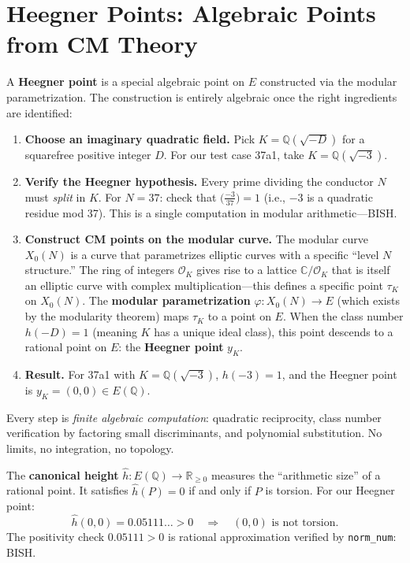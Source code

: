 \documentclass[11pt,twoside,openany]{report}
\theoremstyle{remark}
\newcommand{\BISH}{\textsf{BISH}}
\begin{document}
\section{Heegner Points: Algebraic Points from CM Theory}

A \textbf{Heegner point} is a special algebraic point on $E$ constructed via the modular parametrization. The construction is entirely algebraic once the right ingredients are identified:

\begin{enumerate}
  \item \textbf{Choose an imaginary quadratic field.} Pick $K = \mathbb{Q}(\sqrt{-D})$ for a squarefree positive integer $D$. For our test case 37a1, take $K = \mathbb{Q}(\sqrt{-3})$.

  \item \textbf{Verify the Heegner hypothesis.} Every prime dividing the conductor $N$ must \emph{split} in $K$. For $N = 37$: check that $\bigl(\frac{-3}{37}\bigr) = 1$ (i.e., $-3$ is a quadratic residue mod 37). This is a single computation in modular arithmetic---\BISH.

  \item \textbf{Construct CM points on the modular curve.} The modular curve $X_0(N)$ is a curve that parametrizes elliptic curves with a specific ``level $N$ structure.'' The ring of integers $\mathcal{O}_K$ gives rise to a lattice $\mathbb{C}/\mathcal{O}_K$ that is itself an elliptic curve with complex multiplication---this defines a specific point $\tau_K$ on $X_0(N)$. The \textbf{modular parametrization} $\varphi\colon X_0(N) \to E$ (which exists by the modularity theorem) maps $\tau_K$ to a point on $E$. When the class number $h(-D) = 1$ (meaning $K$ has a unique ideal class), this point descends to a rational point on $E$: the \textbf{Heegner point} $y_K$.

  \item \textbf{Result.} For 37a1 with $K = \mathbb{Q}(\sqrt{-3})$, $h(-3) = 1$, and the Heegner point is $y_K = (0, 0) \in E(\mathbb{Q})$.
\end{enumerate}

Every step is \emph{finite algebraic computation}: quadratic reciprocity, class number verification by factoring small discriminants, and polynomial substitution. No limits, no integration, no topology.

The \textbf{canonical height} $\hat{h}\colon E(\mathbb{Q}) \to \mathbb{R}_{\geq 0}$ measures the ``arithmetic size'' of a rational point. It satisfies $\hat{h}(P) = 0$ if and only if $P$ is torsion. For our Heegner point:
\[
  \hat{h}(0, 0) = 0.05111\ldots > 0 \quad \Longrightarrow \quad (0,0) \text{ is not torsion.}
\]
The positivity check $0.05111 > 0$ is rational approximation verified by \texttt{norm\_num}: \BISH.
\end{document}
